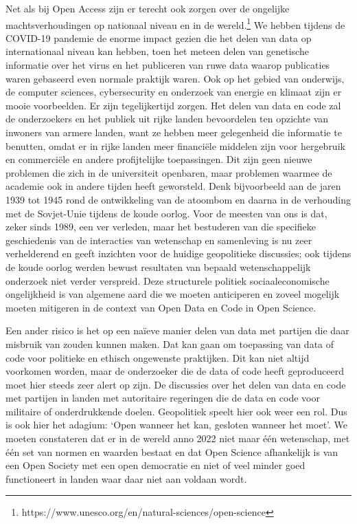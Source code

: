 \documentclass[empirical, authordate, ]{new-jote-article}
\begin{document}
	Net als bij Open Access zijn er terecht ook zorgen over de ongelijke machtsverhoudingen op nationaal niveau en in de wereld.\footnote{https://www.unesco.org/en/natural-sciences/open-science} We hebben tijdens de COVID-19 pandemie de enorme impact gezien die het delen van data op internationaal niveau kan hebben, toen het meteen delen van genetische informatie over het virus en het publiceren van ruwe data waarop publicaties waren gebaseerd even normale praktijk waren. Ook op het gebied van onderwijs, de computer sciences, cybersecurity en onderzoek van energie en klimaat zijn er mooie voorbeelden. Er zijn tegelijkertijd zorgen. Het delen van data en code zal de onderzoekers en het publiek uit rijke landen bevoordelen ten opzichte van inwoners van armere landen, want ze hebben meer gelegenheid die informatie te benutten, omdat er in rijke landen meer financiële middelen zijn voor hergebruik en commerciële en andere profijtelijke toepassingen. Dit zijn geen nieuwe problemen die zich in de universiteit openbaren, maar problemen waarmee de academie ook in andere tijden heeft geworsteld. Denk bijvoorbeeld aan de jaren 1939 tot 1945 rond de ontwikkeling van de atoombom en daarna in de verhouding met de Sovjet-Unie tijdens de koude oorlog. Voor de meesten van ons is dat, zeker sinds 1989, een ver verleden, maar het bestuderen van die specifieke geschiedenis van de interacties van wetenschap en samenleving is nu zeer verhelderend en geeft inzichten voor de huidige geopolitieke discussies; ook tijdens de koude oorlog werden bewust resultaten van bepaald wetenschappelijk onderzoek niet verder verspreid. Deze structurele politiek sociaaleconomische ongelijkheid is van algemene aard die we moeten anticiperen en zoveel mogelijk moeten mitigeren in de context van Open Data en Code in Open Science.



	Een ander risico is het op een naïeve manier delen van data met partijen die daar misbruik van zouden kunnen maken. Dat kan gaan om toepassing van data of code voor politieke en ethisch ongewenste praktijken. Dit kan niet altijd voorkomen worden, maar de onderzoeker die de data of code heeft geproduceerd moet hier steeds zeer alert op zijn. De discussies over het delen van data en code met partijen in landen met autoritaire regeringen die de data en code voor militaire of onderdrukkende doelen. Geopolitiek speelt hier ook weer een rol. Dus is ook hier het adagium: ‘Open wanneer het kan, gesloten wanneer het moet'. We moeten constateren dat er in de wereld anno 2022 niet maar één wetenschap, met één set van normen en waarden bestaat en dat Open Science afhankelijk is van een Open Society met een open democratie en niet of veel minder goed functioneert in landen waar daar niet aan voldaan wordt.
\end{document}

